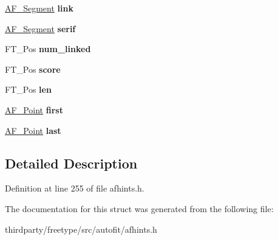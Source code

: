 \begin{DoxyCompactItemize}
\mbox{\label{struct_a_f___segment_rec___a7283d71a7e761ea793b9908cf0be7bb9}} 
\hyperlink{struct_a_f___segment_rec__}{A\+F\+\_\+\+Segment} {\bfseries link}
\item 
\mbox{\label{struct_a_f___segment_rec___af0b01b67fb7b94d387ac64ee86f21a15}} 
\hyperlink{struct_a_f___segment_rec__}{A\+F\+\_\+\+Segment} {\bfseries serif}
\item 
\mbox{\label{struct_a_f___segment_rec___a96c84500df1a004ae29439030d772c7c}} 
F\+T\+\_\+\+Pos {\bfseries num\+\_\+linked}
\item 
\mbox{\label{struct_a_f___segment_rec___ae84e19dcd0a5ef19baa19f1b8d0258ca}} 
F\+T\+\_\+\+Pos {\bfseries score}
\item 
\mbox{\label{struct_a_f___segment_rec___ac75cbe8b7d1f0ca6a8b177e5d09f9982}} 
F\+T\+\_\+\+Pos {\bfseries len}
\item 
\mbox{\label{struct_a_f___segment_rec___a73795f6dab95b41ea461c3ffd926f90c}} 
\hyperlink{struct_a_f___point_rec__}{A\+F\+\_\+\+Point} {\bfseries first}
\item 
\mbox{\label{struct_a_f___segment_rec___a1e2d450a4f1684bee96c39209970f324}} 
\hyperlink{struct_a_f___point_rec__}{A\+F\+\_\+\+Point} {\bfseries last}
\end{DoxyCompactItemize}


\subsection{Detailed Description}


Definition at line 255 of file afhints.\+h.



The documentation for this struct was generated from the following file\+:\begin{DoxyCompactItemize}
\item 
thirdparty/freetype/src/autofit/afhints.\+h\end{DoxyCompactItemize}
